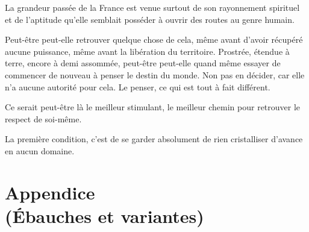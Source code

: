 \documentclass[french,twoside]{book} %
\begin{document}
La grandeur passée de la France est venue surtout de son rayonnement spirituel et de l'aptitude qu'elle semblait posséder à ouvrir des routes au genre humain.\par
Peut-être peut-elle retrouver quelque chose de cela, même avant d'avoir récupéré aucune puissance, même avant la libération du territoire. Prostrée, étendue à terre, encore à demi assommée, peut-être peut-elle quand même essayer de commencer de nouveau à penser le destin du monde. Non pas en décider, car elle n'a aucune autorité pour cela. Le penser, ce qui est tout à fait différent.\par
Ce serait peut-être là le meilleur stimulant, le meilleur chemin pour retrou­ver le respect de soi-même.\par
La première condition, c'est de se garder absolument de rien cristalliser d'avance en aucun domaine.\par

\backmatter \section[Appendice, (Ébauches et variantes)]{Appendice \\
(Ébauches et variantes)}\renewcommand{\leftmark}{Appendice \\
(Ébauches et variantes)}

\noindent \par
\par
\end{document}
